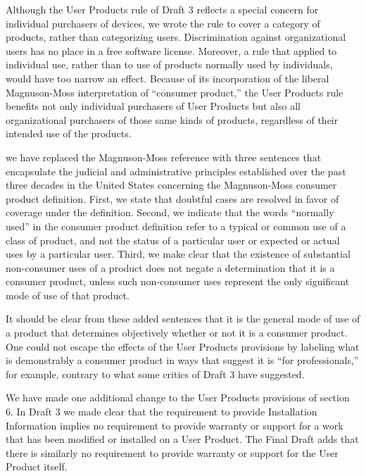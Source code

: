 Although the User Products rule of Draft 3 reflects a special concern
for individual purchasers of devices, we wrote the rule to cover a
category of products, rather than categorizing users.  Discrimination
against organizational users has no place in a free software license.
Moreover, a rule that applied to individual use, rather than to use of
products normally used by individuals, would have too narrow an
effect. Because of its incorporation of the liberal Magnuson-Moss
interpretation of ``consumer product,'' the User Products rule benefits
not only individual purchasers of User Products but also all
organizational purchasers of those same kinds of products, regardless of
their intended use of the products.

we have replaced the Magnuson-Moss
reference with three sentences that encapsulate the judicial and
administrative principles established over the past three decades in the
United States concerning the Magnuson-Moss consumer product definition.
First, we state that doubtful cases are resolved in favor of coverage
under the definition.  Second, we indicate that the words ``normally
used'' in the consumer product definition refer to a typical or common
use of a class of product, and not the status of a particular user or
expected or actual uses by a particular user.  Third, we make clear that
the existence of substantial non-consumer uses of a product does not
negate a determination that it is a consumer product, unless such
non-consumer uses represent the only significant mode of use of that
product.

It should be clear from these added sentences that it is the general
mode of use of a product that determines objectively whether or not it
is a consumer product.  One could not escape the effects of the User
Products provisions by labeling what is demonstrably a consumer product
in ways that suggest it is ``for professionals,'' for example, contrary
to what some critics of Draft 3 have suggested.

We have made one additional change to the User Products provisions of
section 6.  In Draft 3 we made clear that the requirement to provide
Installation Information implies no requirement to provide warranty or
support for a work that has been modified or installed on a User
Product.  The Final Draft adds that there is similarly no requirement to
provide warranty or support for the User Product itself.


